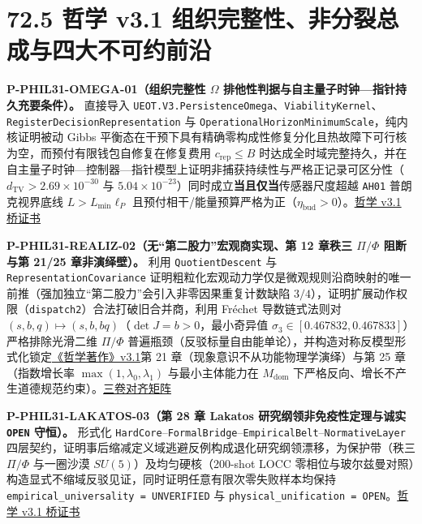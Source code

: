 \documentclass[
  11pt,
  oneside]{book}
\begin{document}
\section{72.5 哲学 v3.1 组织完整性、非分裂总成与四大不可约前沿}

\protect\hypertarget{p-phil31-omega-01}{}{}

\textbf{P-PHIL31-OMEGA-01（组织完整性 \(\Omega\)
排他性判据与自主量子时钟---指针持久充要条件）。} 直接导入
\texttt{UEOT.\allowbreak V3.\allowbreak Persistence\allowbreak Omega}、\allowbreak \texttt{Viability\allowbreak Kernel}、\allowbreak \texttt{Register\allowbreak Decision\allowbreak Representation}
与 \texttt{Operational\allowbreak Horizon\allowbreak Minimum\allowbreak Scale}，纯内核证明被动 Gibbs
平衡态在干预下具有精确零构成性修复分化且热故障下可行核为空，而预付有限钱包自修复在修复费用
\(c_{\mathrm{rep}} \le B\)
时达成全时域完整持久，并在自主量子时钟---控制器---指针模型上证明非捕获持续性与严格正记录可区分性（\(d_{\mathrm{TV}} > 2.69\times 10^{-30}\)
与 \(5.04\times 10^{-23}\)）同时成立\textbf{当且仅当}传感器尺度超越
\texttt{AH01} 普朗克视界底线 \(L > L_{\min}\ell_P\)
且预付相干/能量预算严格为正（\(\eta_{\mathrm{bud}} > 0\)）。\href{../../unification/philosophy_v31_omega_bridge/certificate.json}{哲学
v3.1 桥证书}

\protect\hypertarget{p-phil31-realiz-02}{}{}

\textbf{P-PHIL31-REALIZ-02（无``第二股力''宏观商实现、第 12 章秩三
\(\Pi/\Phi\) 阻断与第 21/25 章非演绎壁）。} 利用
\texttt{Quotient\allowbreak Descent} 与 \texttt{Representation\allowbreak Covariance}
证明粗粒化宏观动力学仅是微观规则沿商映射的唯一前推（强加独立``第二股力''会引入非零因果重复计数缺陷
\(3/4\)），证明扩展动作权限（\texttt{dispatch2}）合法打破旧合并商，利用
Fréchet 导数链式法则对
\((s,b,q) \mapsto (s,b,bq)\)（\(\det J = b > 0\)，最小奇异值
\(\sigma_3 \in [0.467832, 0.467833]\)）严格排除光滑二维 \(\Pi/\Phi\)
普遍瓶颈（反驳标量自由能单论），并构造对称反模型形式化锁定\href{../../interfaces/PHILOSOPHY_MATHEMATICS_PHYSICS_UNIFICATION_MATRIX.md}{《哲学著作》v3.1}第
21 章（现象意识不从功能物理学演绎）与第 25 章（指数增长率
\(\max(1,\lambda_0,\lambda_1)\) 与最小主体能力在 \(M_{\mathrm{dom}}\)
下严格反向、增长不产生道德规范约束）。\href{../../interfaces/PHILOSOPHY_MATHEMATICS_PHYSICS_UNIFICATION_MATRIX.md}{三卷对齐矩阵}

\protect\hypertarget{p-phil31-lakatos-03}{}{}

\textbf{P-PHIL31-LAKATOS-03（第 28 章 Lakatos 研究纲领非免疫性定理与诚实
\texttt{OPEN} 守恒）。} 形式化
\texttt{Hard\allowbreak Core}--\texttt{Formal\allowbreak Bridge}--\texttt{Empirical\allowbreak Belt}--\texttt{Normative\allowbreak Layer}
四层契约，证明事后缩减定义域逃避反例构成退化研究纲领漂移，为保护带（秩三
\(\Pi/\Phi\) 与一圈沙漠 \(SU(5)\)）及均匀硬核（200-shot LOCC
零相位与玻尔兹曼对照）构造显式不缩域反驳见证，同时证明任意有限次零失败样本均保持
\texttt{empirical\_\allowbreak universality\ =\ UNVERIFIED} 与
\texttt{physical\_\allowbreak unification\ =\ OPEN}。\href{../../unification/philosophy_v31_omega_bridge/certificate.json}{哲学
v3.1 桥证书}
\end{document}
